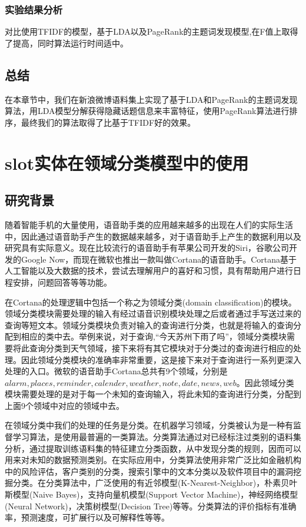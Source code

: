 \documentclass[master]{njuthesis}
\begin{document}
\subsection{实验结果分析}

    对比使用TFIDF的模型，基于LDA以及PageRank的主题词发现模型,在F值上取得了提高，同时算法运行时间适中。
\section{总结}

在本章节中，我们在新浪微博语料集上实现了基于LDA和PageRank的主题词发现算法，用LDA模型分解获得隐藏话题信息来丰富特征，使用PageRank算法进行排序，最终我们的算法取得了比基于TFIDF好的效果。

\chapter{slot实体在领域分类模型中的使用}\label{chapter_classification}

\section{研究背景}

    随着智能手机的大量使用，语音助手类的应用越来越多的出现在人们的实际生活中，因此通过语音助手产生的数据越来越多，对于语音助手上产生的数据利用以及研究具有实际意义。现在比较流行的语音助手有苹果公司开发的Siri，谷歌公司开发的Google Now，而现在微软也推出一款叫做Cortana的语音助手。Cortana基于人工智能以及大数据的技术，尝试去理解用户的喜好和习惯，具有帮助用户进行日程安排，问题回答等等功能。

    在Cortana的处理逻辑中包括一个称之为领域分类(domain classification)的模块。领域分类模块需要处理的输入有经过语音识别模块处理之后或者通过手写送过来的查询等短文本。领域分类模块负责对输入的查询进行分类，也就是将输入的查询分配到相应的类中去。举例来说，对于查询,“今天苏州下雨了吗”，领域分类模块需要将此查询分类到天气领域，接下来将有其它模块对于分类过的查询进行相应的处理。因此领域分类模块的准确率非常重要，这是接下来对于查询进行一系列更深入处理的入口。微软的语音助手Cortana总共有9个领域，分别是$alarm,places,reminder,calender,weather,note,date,news,web$。因此领域分类模块需要处理的是对于每一个未知的查询输入，将此未知的查询进行分类，分配到上面9个领域中对应的领域中去。

    在领域分类中我们的处理的任务是分类。在机器学习领域，分类被认为是一种有监督学习算法，是使用最普遍的一类算法。分类算法通过对已经标注过类别的语料集分析，通过提取训练语料集的特征建立分类函数，从中发现分类的规则，因而可以用来对未知的数据预测类别。在实际应用中，分类算法使用非常广泛比如金融机构中的风险评估，客户类别的分类，搜索引擎中的文本分类以及软件项目中的漏洞挖掘分类。在分类算法中，广泛使用的有近邻模型(K-Nearest-Neighbor)，朴素贝叶斯模型(Naive Bayes)，支持向量机模型(Support Vector Machine)，神经网络模型(Neural Network)，决策树模型(Decision Tree)等等。分类算法的评价指标有准确率，预测速度，可扩展行以及可解释性等等。
    
\end{document}
